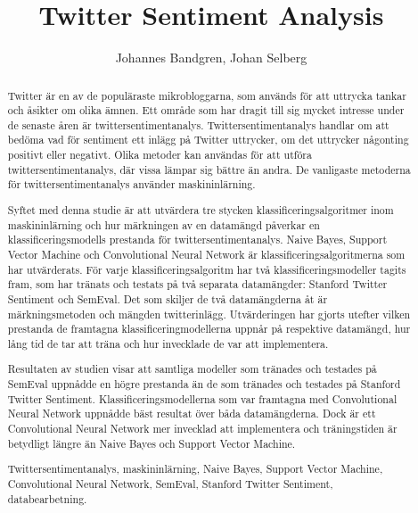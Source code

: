 \documentclass{kaumasters} %
\title{Twitter Sentiment Analysis}
\author{Johannes Bandgren, Johan Selberg}
\institute{Department of Computer Science}
\begin{document}



\frontmatter
\approvalpage%

\begin{abstract}
Twitter är en av de populäraste mikrobloggarna, som används för att uttrycka tankar och åsikter om olika ämnen. Ett område som har dragit till sig mycket intresse under de senaste åren är twittersentimentanalys. Twittersentimentanalys handlar om att bedöma vad för sentiment ett inlägg på Twitter uttrycker, om det uttrycker någonting positivt eller negativt. Olika metoder kan användas för att utföra twittersentimentanalys, där vissa lämpar sig bättre än andra. De vanligaste metoderna för twittersentimentanalys använder maskininlärning. 

Syftet med denna studie är att utvärdera tre stycken klassificeringsalgoritmer inom maskininlärning och hur märkningen av en datamängd påverkar en klassificeringsmodells prestanda för twittersentimentanalys. Naive Bayes, Support Vector Machine och Convolutional Neural Network är klassificeringsalgoritmerna som har utvärderats. För varje klassificeringsalgoritm har två klassificeringsmodeller tagits fram, som har tränats och testats på två separata datamängder: Stanford Twitter Sentiment och SemEval. Det som skiljer de två datamängderna åt är märkningsmetoden och mängden twitterinlägg. Utvärderingen har gjorts utefter vilken prestanda de framtagna klassificeringmodellerna uppnår på respektive datamängd, hur lång tid de tar att träna och hur invecklade de var att implementera. 

Resultaten av studien visar att samtliga modeller som tränades och testades på SemEval uppnådde en högre prestanda än de som tränades och testades på Stanford Twitter Sentiment. Klassificeringsmodellerna som var framtagna med Convolutional Neural Network uppnådde bäst resultat över båda datamängderna. Dock är ett Convolutional Neural Network mer invecklad att implementera och träningstiden är betydligt längre än Naive Bayes och Support Vector Machine.

  \keywords Twittersentimentanalys, maskininlärning, Naive Bayes, Support Vector Machine, Convolutional Neural Network, SemEval, Stanford Twitter Sentiment, databearbetning.
\end{abstract}
\end{document}
